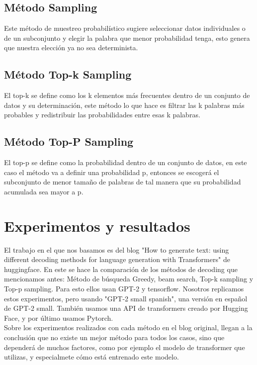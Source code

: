 \documentclass[10pt,twocolumn]{article}
\theoremstyle{definition}
\begin{document}
\subsection{Método Sampling}
Este método de muestreo probabilístico sugiere seleccionar datos individuales o de un subconjunto y elegir la palabra que menor probabilidad tenga, esto genera que nuestra elección ya no sea determinista.

\subsection{Método Top-k Sampling}
El top-k se define como los k elementos más frecuentes dentro de un conjunto de datos y su determinación, este método lo que hace es filtrar las  k palabras más probables y redistribuir las probabilidades entre esas k palabras.

\subsection{Método Top-P Sampling}
El top-p se define como la probabilidad dentro de un conjunto de datos, en este caso el método va a definir una probabilidad p, entonces se escogerá el subconjunto de menor tamaño de palabras de tal manera que su probabilidad acumulada sea mayor a p.

\section{Experimentos y resultados}
El trabajo en el que nos basamos es del blog "How to generate text: using different decoding methods for language generation with Transformers" de huggingface. En este se hace la comparación de los métodos de decoding que mencionamos antes: Método de búsqueda Greedy, beam search, Top-k sampling y Top-p sampling. Para esto ellos usan GPT-2 y tensorflow. Nosotros replicamos estos experimentos, pero usando "GPT-2 small spanish", una versión en español de GPT-2 small. También usamos una API de transformers creado por Hugging Face, y por último usamos Pytorch. \\
Sobre los experimentos realizados con cada método en el blog original, llegan a la conclusión que no existe un mejor método para todos los casos, sino que dependerá de muchos factores, como por ejemplo el modelo de transformer que utilizas, y especialmete cómo está entrenado este modelo. \\
\end{document}
